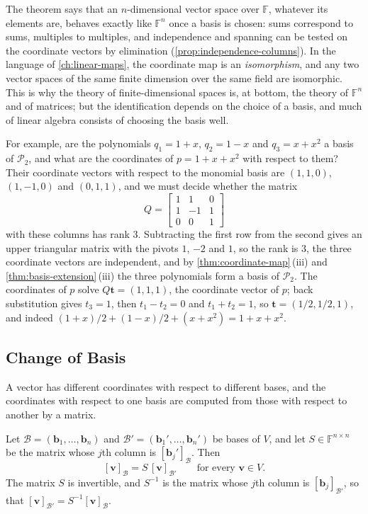 The theorem says that an $n$-dimensional vector space over $\mathbb F$, whatever its elements are, behaves exactly like $\mathbb F^n$ once a basis is chosen: sums correspond to sums, multiples to multiples, and independence and spanning can be tested on the coordinate vectors by elimination (\cref{prop:independence-columns}). In the language of \cref{ch:linear-maps}, the coordinate map is an \emph{isomorphism}, and any two vector spaces of the same finite dimension over the same field are isomorphic. This is why the theory of finite-dimensional spaces is, at bottom, the theory of $\mathbb F^n$ and of matrices; but the identification depends on the choice of a basis, and much of linear algebra consists of choosing the basis well.

For example, are the polynomials $q_1=1+x$, $q_2=1-x$ and $q_3=x+x^2$ a basis of $\mathcal P_2$, and what are the coordinates of $p=1+x+x^2$ with respect to them? Their coordinate vectors with respect to the monomial basis are $(1,1,0)$, $(1,-1,0)$ and $(0,1,1)$, and we must decide whether the matrix
\[
Q=\begin{bmatrix}1&1&0\\1&-1&1\\0&0&1\end{bmatrix}
\]
with these columns has rank $3$. Subtracting the first row from the second gives an upper triangular matrix with the pivots $1$, $-2$ and $1$, so the rank is $3$, the three coordinate vectors are independent, and by \cref{thm:coordinate-map}\,(iii) and \cref{thm:basis-extension}\,(iii) the three polynomials form a basis of $\mathcal P_2$. The coordinates of $p$ solve $Q\mathbf t=(1,1,1)$, the coordinate vector of $p$; back substitution gives $t_3=1$, then $t_1-t_2=0$ and $t_1+t_2=1$, so $\mathbf t=(1/2,1/2,1)$, and indeed $(1+x)/2+(1-x)/2+(x+x^2)=1+x+x^2$.

\subsection{Change of Basis}

A vector has different coordinates with respect to different bases, and the coordinates with respect to one basis are computed from those with respect to another by a matrix.

\begin{theorem}
\label{thm:change-of-basis}
Let $\mathcal B=(\mathbf b_1,\ldots,\mathbf b_n)$ and $\mathcal B'=(\mathbf b_1',\ldots,\mathbf b_n')$ be bases of $V$, and let $S\in\mathbb F^{n\times n}$ be the matrix whose $j$th column is $[\mathbf b_j']_{\mathcal B}$. Then
\[
[\mathbf v]_{\mathcal B}=S\,[\mathbf v]_{\mathcal B'}\qquad\text{for every }\mathbf v\in V .
\]
The matrix $S$ is invertible, and $S^{-1}$ is the matrix whose $j$th column is $[\mathbf b_j]_{\mathcal B'}$, so that $[\mathbf v]_{\mathcal B'}=S^{-1}[\mathbf v]_{\mathcal B}$.
\end{theorem}

